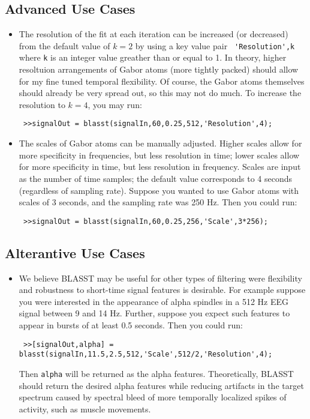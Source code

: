 \documentclass[11pt]{article}
\theoremstyle{remark}
\begin{document}
\subsection{Advanced Use Cases}

\begin{itemize}

\item The resolution of the fit at each iteration can be increased (or decreased) from the default value of $k = 2$ by using a key value pair \verb~ 'Resolution',k~ where \verb~k~ is an integer value greather than or equal to 1. In theory, higher resoltuion arrangements of Gabor atoms (more tightly packed) should allow for my fine tuned temporal flexibility. Of course, the Gabor atoms themselves should already be very spread out, so this may not do much. To increase the resolution to $k = 4$, you may run:

\verb~ >>signalOut = blasst(signalIn,60,0.25,512,'Resolution',4);~

\item The scales of Gabor atoms can be manually adjusted. Higher scales allow for more specificity in frequencies, but less resolution in time; lower scales allow for more specificity in time, but less resolution in frequency. Scales are input as the number of time samples; the default value corresponds to 4 seconds (regardless of sampling rate). Suppose you wanted to use Gabor atoms with scales of 3 seconds, and the sampling rate was 250 Hz. Then you could run:

\verb~ >>signalOut = blasst(signalIn,60,0.25,256,'Scale',3*256);~

\end{itemize}

\subsection{Alterantive Use Cases}

\begin{itemize}

\item We believe BLASST may be useful for other types of filtering were flexibility and robustness to short-time signal features is desirable. For example suppose you were interested in the appearance of alpha spindles in a 512 Hz EEG signal between 9 and 14  Hz. Further, suppose you expect such features to appear in bursts of at least 0.5 seconds. Then you could run:

\verb~ >>[signalOut,alpha] = blasst(signalIn,11.5,2.5,512,'Scale',512/2,'Resolution',4);~

Then \verb~alpha~ will be returned as the alpha features. Theoretically, BLASST should return the desired alpha features while reducing artifacts in the target spectrum caused by spectral bleed of more temporally localized spikes of activity, such as muscle movements.


\end{itemize}
\end{document}
